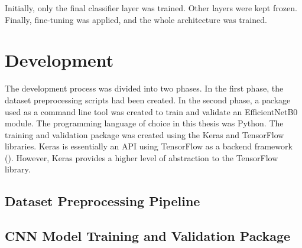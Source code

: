\documentclass{BachelorBUI}
\begin{document}
    Initially, only the final classifier layer was trained. Other layers were kept frozen. Finally, fine-tuning was applied, and the whole architecture was trained.

\section{Development}
    The development process was divided into two phases. In the first phase, the dataset preprocessing scripts had been created. In the second phase, a package used as a command line tool was created to train and validate an EfficientNetB0 module. The programming language of choice in this thesis was Python. The training and validation package was created using the Keras and TensorFlow libraries. Keras is essentially an API using TensorFlow as a backend framework (\cite{tensorflow:2024, keras:2024}). However, Keras provides a higher level of abstraction to the TensorFlow library.

    \subsection{Dataset Preprocessing Pipeline}
    \subsection{CNN Model Training and Validation Package}

\end{document}
